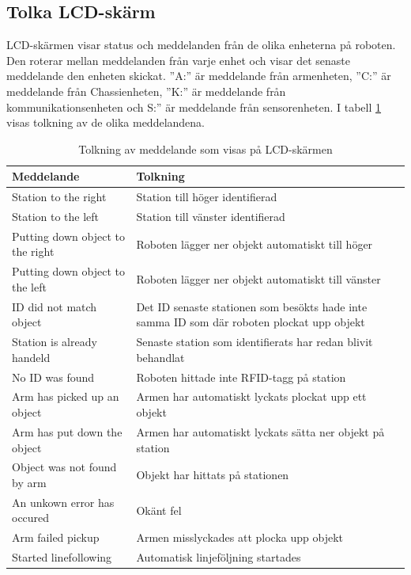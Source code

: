 \documentclass[a4paper,12pt]{article}
\begin{document}
\subsection{Tolka LCD-skärm}
LCD-skärmen visar status och meddelanden från de olika enheterna på roboten. Den roterar mellan meddelanden från varje enhet och visar det senaste meddelande den enheten skickat. ''A:'' är meddelande från armenheten, ''C:'' är meddelande från Chassienheten, ''K:'' är meddelande från kommunikationsenheten och S:'' är meddelande från sensorenheten. 
I tabell \ref{tab:lcd} visas tolkning av de olika meddelandena.

\begin{table}[H]
\centering
    \begin{tabularx}{\textwidth}{|l|X|}
        \hline \textbf{Meddelande} & \textbf{Tolkning} \\ \hline
    Station to the right & Station till höger identifierad \\ \hline
    Station to the left & Station till vänster identifierad \\ \hline
    Putting down object to the right & Roboten lägger ner objekt automatiskt till höger\\ \hline
    Putting down object to the left & Roboten lägger ner objekt automatiskt till vänster \\ \hline
    ID did not match object & Det ID senaste stationen som besökts hade inte samma ID som där roboten plockat upp objekt \\ \hline
    Station is already handeld & Senaste station som identifierats har redan blivit behandlat\\ \hline
    No ID was found & Roboten hittade inte RFID-tagg på station \\ \hline
    Arm has picked up an object & Armen har automatiskt lyckats plockat upp ett objekt\\ \hline
    Arm has put down the object & Armen har automatiskt lyckats sätta ner objekt på station \\ \hline
    Object was not found by arm & Objekt har hittats på stationen \\ \hline
    An unkown error has occured & Okänt fel \\ \hline
    Arm failed pickup & Armen misslyckades att plocka upp objekt \\ \hline
    Started linefollowing & Automatisk linjeföljning startades \\ \hline
    \end{tabularx}
\caption{Tolkning av meddelande som visas på LCD-skärmen}
\label{tab:lcd}
\end{table}
\end{document}
